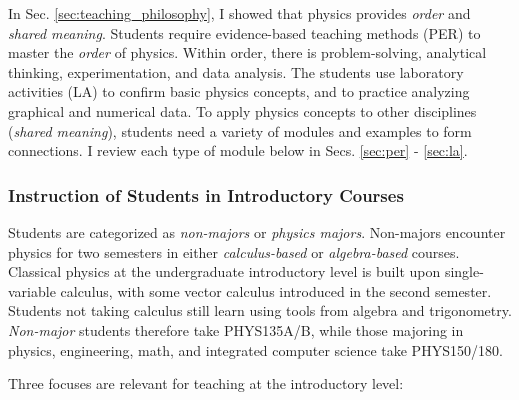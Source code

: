 \documentclass[../../../main.tex]{subfiles}
\begin{document}
In Sec. \ref{sec:teaching_philosophy}, I showed that physics provides \textit{order} and \textit{shared meaning}.  Students require evidence-based teaching methods (PER) to master the \textit{order} of physics.  Within order, there is problem-solving, analytical thinking, experimentation, and data analysis.  The students use laboratory activities (LA) to confirm basic physics concepts, and to practice analyzing graphical and numerical data.  To apply physics concepts to other disciplines (\textit{shared meaning}), students need a variety of modules and examples to form connections.  I review each type of module below in Secs. \ref{sec:per} - \ref{sec:la}.

\subsubsection{Instruction of Students in Introductory Courses}

Students are categorized as \textit{non-majors} or \textit{physics majors}.  Non-majors encounter physics for two semesters in either \textit{calculus-based} or \textit{algebra-based} courses.  Classical physics at the undergraduate introductory level is built upon single-variable calculus, with some vector calculus introduced in the second semester.  Students not taking calculus still learn using tools from algebra and trigonometry.  \textit{Non-major} students therefore take PHYS135A/B, while those majoring in physics, engineering, math, and integrated computer science take PHYS150/180.
\\
\vspace{0.15cm}

Three focuses are relevant for teaching at the introductory level:
\end{document}
